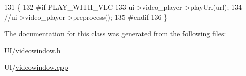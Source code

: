 \begin{DoxyCode}
131 \{
132 \textcolor{preprocessor}{#if PLAY\_WITH\_VLC}
133 \textcolor{preprocessor}{}   ui->video\_player->playUrl(url);
134     \textcolor{comment}{//ui->video\_player->preprocess();}
135 \textcolor{preprocessor}{#endif}
136 \textcolor{preprocessor}{}\}
\end{DoxyCode}


The documentation for this class was generated from the following files\-:\begin{DoxyCompactItemize}
\item 
U\-I/\hyperlink{videowindow_8h}{videowindow.\-h}\item 
U\-I/\hyperlink{videowindow_8cpp}{videowindow.\-cpp}\end{DoxyCompactItemize}
